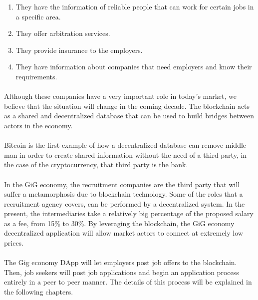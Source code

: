 \documentclass{article}
\begin{document}
\begin{enumerate}
  \item They have the information of reliable people that can work for certain jobs in a specific area.
  \item They offer arbitration services.
  \item They provide insurance to the employers.
  \item They have information about companies that need employers and know their requirements.

\end{enumerate}

\paragraph{} Although these companies have a very important role in today's market, we believe that the situation will change in the coming decade. The blockchain acts as a shared and decentralized database that can be used to build bridges between actors in the economy.

\paragraph{} Bitcoin is the first example of how a decentralized database can remove middle man in order to create shared information without the need of a third party, in the case of the cryptocurrency, that third party is the bank.

\paragraph{} In the GiG economy, the recruitment companies are the third party that will suffer a metamorphosis due to blockchain technology. Some of the roles that a recruitment agency covers, can be performed by a decentralized system. In the present, the intermediaries take a relatively big percentage of the proposed salary as a fee, from 15\% to 30\%. By leveraging the blockchain, the GiG economy decentralized application will allow market actors to connect at extremely low prices.

\paragraph{} The Gig economy DApp will let employers post job offers to the blockchain. Then, job seekers will post job applications and begin an application process entirely in a peer to peer manner. The details of this process will be explained in the following chapters.
\end{document}
